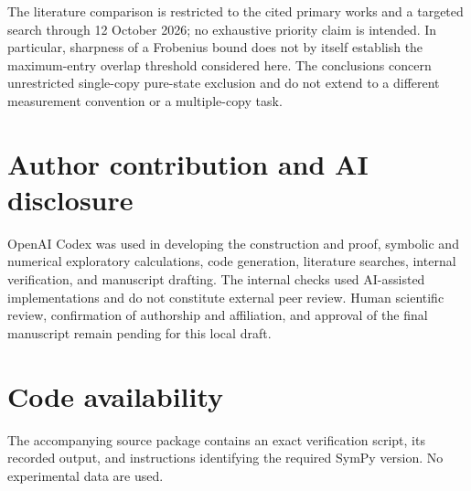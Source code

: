 \documentclass[11pt]{article}
\begin{document}
The literature comparison is restricted to the cited primary works
and a targeted search through 12 October 2026; no exhaustive priority
claim is intended. In particular, sharpness of a Frobenius bound does
not by itself establish the maximum-entry overlap threshold considered
here. The conclusions concern unrestricted single-copy pure-state
exclusion and do not extend to a different measurement convention
or a multiple-copy task.

\section*{Author contribution and AI disclosure}
OpenAI Codex was used in developing the construction and proof,
symbolic and numerical exploratory calculations, code generation,
literature searches, internal verification, and manuscript drafting.
The internal checks used AI-assisted implementations and do not
constitute external peer review. Human scientific review, confirmation
of authorship and affiliation, and approval of the final manuscript
remain pending for this local draft.

\section*{Code availability}
The accompanying source package contains an exact verification script,
its recorded output, and instructions identifying the required SymPy
version. No experimental data are used.



\end{document}
